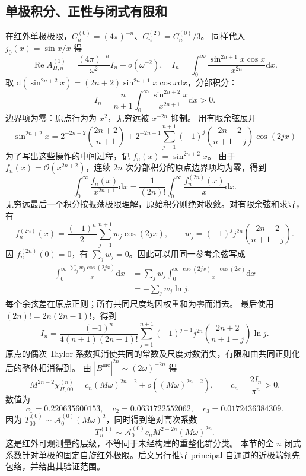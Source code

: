 \documentclass[UTF8,fontset=fandol,11pt,a4paper]{ctexart}
\newcommand{\dd}{\mathrm{d}}
\newcommand{\Rea}{\operatorname{Re}}
\newcommand{\Bin}{B^{\mathrm{inc}}}
\newcommand{\calO}{\mathcal O}
\numberwithin{equation}{section}
\begin{document}
\subsection{单极积分、正性与闭式有限和}
在红外单极极限，$C_n^{(0)}=(4\pi)^{-n}$、$C_n^{(2)}=C_n^{(0)}/3$。
同样代入 $j_0(x)=\sin x/x$ 得
\begin{equation}
\Rea A_{H,n}^{(1)}=\frac{(4\pi)^{-n}}{\omega^2}I_n+o(\omega^{-2}),\quad
I_n=\int_0^\infty\frac{\sin^{2n+1}x\cos x}{x^{2n}}\dd x.
\end{equation}
取 $\dd(\sin^{2n+2}x)=(2n+2)\sin^{2n+1}x\cos x\dd x$，分部积分：
\begin{equation}
I_n=\frac{n}{n+1}\int_0^\infty\frac{\sin^{2n+2}x}{x^{2n+1}}\dd x>0.
\end{equation}
边界项为零：原点行为为 $x^2$，无穷远被 $x^{-2n}$ 抑制。
用有限余弦展开
\begin{equation}
\sin^{2n+2}x=2^{-2n-2}\binom{2n+2}{n+1}
+2^{-2n-1}\sum_{j=1}^{n+1}(-1)^j\binom{2n+2}{n+1-j}\cos(2jx)
\end{equation}
为了写出这些操作的中间过程，记 $f_n(x)=\sin^{2n+2}x$。
由于 $f_n(x)=\calO(x^{2n+2})$，连续 $2n$ 次分部积分的原点边界项均为零，得到
\begin{equation}
\int_0^\infty\frac{f_n(x)}{x^{2n+1}}\dd x
=\frac1{(2n)!}\int_0^\infty\frac{f_n^{(2n)}(x)}x\dd x.
\end{equation}
无穷远最后一个积分按振荡极限理解，原始积分则绝对收敛。对有限余弦和求导，有
\begin{equation}
f_n^{(2n)}(x)=\frac{(-1)^n}{2}\sum_{j=1}^{n+1}w_j\cos(2jx),\qquad
w_j=(-1)^j j^{2n}\binom{2n+2}{n+1-j}.
\end{equation}
因 $f_n^{(2n)}(0)=0$，有 $\sum_jw_j=0$。因此可以用同一参考余弦写成
\begin{align}
\int_0^\infty\frac{\sum_jw_j\cos(2jx)}x\dd x
&=\sum_jw_j\int_0^\infty\frac{\cos(2jx)-\cos(2x)}x\dd x\nonumber\\
&=-\sum_jw_j\ln j.
\end{align}
每个余弦差在原点正则；所有共同尺度均因权重和为零而消去。
最后使用 $(2n)!=2n(2n-1)!$，得到
\begin{equation}
I_n=\frac{(-1)^n}{4(n+1)(2n-1)!}
\sum_{j=1}^{n+1}(-1)^{j+1}j^{2n}\binom{2n+2}{n+1-j}\ln j.
\end{equation}
原点的偶次 Taylor 系数抵消使共同的常数及尺度对数消失，有限和由共同正则化后的整体相消得到。
由 $|\Bin|^{2n}\sim(2\omega)^{-2n}$ 得
\begin{equation}
\boxed{M^{2n-2}\chi_{H,00}^{(n)}=c_n(M\omega)^{2n-2}
+o((M\omega)^{2n-2}),\qquad c_n=\frac{2I_n}{\pi^n}>0.}
\end{equation}
数值为
\begin{equation}
c_1=0.220635600153,\quad c_2=0.0631722552062,\quad c_3=0.0172436384309.
\end{equation}
因为 $T^{(0)}_{00}\sim\mathcal A_0^{(0)}(M\omega)^2$，同时得到绝对高次系数
\begin{equation}
T_n^{(1)}\sim\mathcal A_0^{(0)}c_n M^{2-2n}(M\omega)^{2n}.
\end{equation}
这是红外可观测量的层级，不等同于未经构建的重整化群分类。
本节的全 $n$ 闭式系数针对单极的固定自旋红外极限。后文另行推导 principal 自通道的近极端领先包络，并给出其验证范围。
\end{document}
